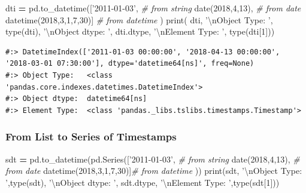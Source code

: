 \documentclass[
]{book}
\newenvironment{Shaded}{\begin{snugshade}}{\end{snugshade}}
\newcommand{\BuiltInTok}[1]{#1}
\newcommand{\CharTok}[1]{\textcolor[rgb]{0.5,0.5,0.5}{#1}}
\newcommand{\CommentTok}[1]{\textcolor[rgb]{0.37,0.37,0.37}{\textit{#1}}}
\newcommand{\DecValTok}[1]{\textcolor[rgb]{0.06,0.06,0.06}{#1}}
\newcommand{\NormalTok}[1]{#1}
\newcommand{\OperatorTok}[1]{\textcolor[rgb]{0.43,0.43,0.43}{\textbf{#1}}}
\newcommand{\StringTok}[1]{\textcolor[rgb]{0.5,0.5,0.5}{#1}}
\begin{document}
\begin{Shaded}
\begin{Highlighting}[]
\NormalTok{dti }\OperatorTok{=}\NormalTok{ pd.to_datetime([}\StringTok{'2011-01-03'}\NormalTok{,             }\CommentTok{# from string}
\NormalTok{                       date(}\DecValTok{2018}\NormalTok{,}\DecValTok{4}\NormalTok{,}\DecValTok{13}\NormalTok{),         }\CommentTok{# from date}
\NormalTok{                       datetime(}\DecValTok{2018}\NormalTok{,}\DecValTok{3}\NormalTok{,}\DecValTok{1}\NormalTok{,}\DecValTok{7}\NormalTok{,}\DecValTok{30}\NormalTok{)] }\CommentTok{# from datetime}
\NormalTok{              )}
\BuiltInTok{print}\NormalTok{( dti,}
      \StringTok{'}\CharTok{\textbackslash{}n}\StringTok{Object Type:  '}\NormalTok{, }\BuiltInTok{type}\NormalTok{(dti),}
      \StringTok{'}\CharTok{\textbackslash{}n}\StringTok{Object dtype: '}\NormalTok{, dti.dtype,}
      \StringTok{'}\CharTok{\textbackslash{}n}\StringTok{Element Type: '}\NormalTok{, }\BuiltInTok{type}\NormalTok{(dti[}\DecValTok{1}\NormalTok{]))}
\end{Highlighting}
\end{Shaded}

\begin{verbatim}
#:> DatetimeIndex(['2011-01-03 00:00:00', '2018-04-13 00:00:00', '2018-03-01 07:30:00'], dtype='datetime64[ns]', freq=None) 
#:> Object Type:   <class 'pandas.core.indexes.datetimes.DatetimeIndex'> 
#:> Object dtype:  datetime64[ns] 
#:> Element Type:  <class 'pandas._libs.tslibs.timestamps.Timestamp'>
\end{verbatim}

\hypertarget{from-list-to-series-of-timestamps}{%
\subsubsection{From List to Series of Timestamps}\label{from-list-to-series-of-timestamps}}

\begin{Shaded}
\begin{Highlighting}[]
\NormalTok{sdt }\OperatorTok{=}\NormalTok{ pd.to_datetime(pd.Series([}\StringTok{'2011-01-03'}\NormalTok{,      }\CommentTok{# from string}
\NormalTok{                                date(}\DecValTok{2018}\NormalTok{,}\DecValTok{4}\NormalTok{,}\DecValTok{13}\NormalTok{),        }\CommentTok{# from date}
\NormalTok{                                datetime(}\DecValTok{2018}\NormalTok{,}\DecValTok{3}\NormalTok{,}\DecValTok{1}\NormalTok{,}\DecValTok{7}\NormalTok{,}\DecValTok{30}\NormalTok{)]}\CommentTok{# from datetime}
\NormalTok{              ))}
\BuiltInTok{print}\NormalTok{(sdt,}
      \StringTok{'}\CharTok{\textbackslash{}n}\StringTok{Object Type:  '}\NormalTok{,}\BuiltInTok{type}\NormalTok{(sdt),}
      \StringTok{'}\CharTok{\textbackslash{}n}\StringTok{Object dtype: '}\NormalTok{, sdt.dtype,}
      \StringTok{'}\CharTok{\textbackslash{}n}\StringTok{Element Type: '}\NormalTok{,}\BuiltInTok{type}\NormalTok{(sdt[}\DecValTok{1}\NormalTok{]))}
\end{Highlighting}
\end{Shaded}
\end{document}
